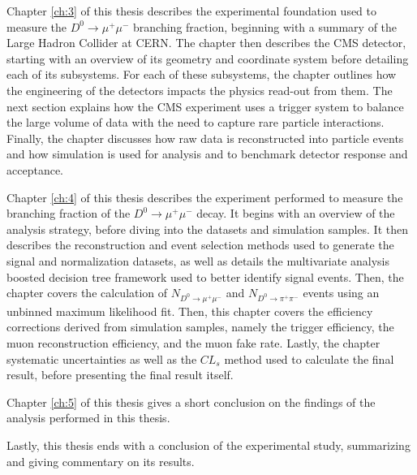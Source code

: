 Chapter \ref{ch:3} of this thesis describes the experimental foundation used to measure the $D^0 \to \mu^+ \mu^-$ branching fraction, beginning with a summary of the Large Hadron Collider at CERN. The chapter then describes the CMS detector, starting with an overview of its geometry and coordinate system before detailing each of its subsystems. For each of these subsystems, the chapter outlines how the engineering of the detectors impacts the physics read-out from them. The next section explains how the CMS experiment uses a trigger system to balance the large volume of data with the need to capture rare particle interactions. Finally, the chapter discusses how raw data is reconstructed into particle events and how simulation is used for analysis and to benchmark detector response and acceptance.

Chapter \ref{ch:4} of this thesis describes the experiment performed to measure the branching fraction of the $D^0 \to \mu^+ \mu^-$ decay. It begins with an overview of the analysis strategy, before diving into the datasets and simulation samples. It then describes the reconstruction and event selection methods used to generate the signal and normalization datasets, as well as details the multivariate analysis boosted decision tree framework used to better identify signal events. Then, the chapter covers the calculation of $N_{D^0 \to \mu^+ \mu^-}$ and $N_{D^0 \to \pi^+ \pi^-}$ events using an unbinned maximum likelihood fit. Then, this chapter covers the efficiency corrections derived from simulation samples, namely the trigger efficiency, the muon reconstruction efficiency, and the muon fake rate. Lastly, the chapter systematic uncertainties as well as the $CL_s$ method used to calculate the final result, before presenting the final result itself. 

Chapter \ref{ch:5} of this thesis gives a short conclusion on the findings of the analysis performed in this thesis.

Lastly, this thesis ends with a conclusion of the experimental study, summarizing and giving commentary on its results. 

